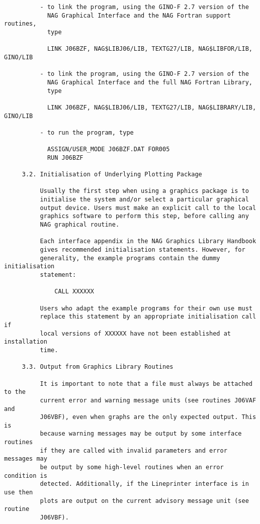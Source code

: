 \begin{verbatim}
          - to link the program, using the GINO-F 2.7 version of the
            NAG Graphical Interface and the NAG Fortran support routines,
            type

            LINK J06BZF, NAG$LIBJ06/LIB, TEXTG27/LIB, NAG$LIBFOR/LIB, GINO/LIB

          - to link the program, using the GINO-F 2.7 version of the
            NAG Graphical Interface and the full NAG Fortran Library,
            type

            LINK J06BZF, NAG$LIBJ06/LIB, TEXTG27/LIB, NAG$LIBRARY/LIB, GINO/LIB

          - to run the program, type

            ASSIGN/USER_MODE J06BZF.DAT FOR005
            RUN J06BZF

     3.2. Initialisation of Underlying Plotting Package

          Usually the first step when using a graphics package is to
          initialise the system and/or select a particular graphical
          output device. Users must make an explicit call to the local
          graphics software to perform this step, before calling any
          NAG graphical routine.

          Each interface appendix in the NAG Graphics Library Handbook
          gives recommended initialisation statements. However, for
          generality, the example programs contain the dummy initialisation
          statement:

              CALL XXXXXX

          Users who adapt the example programs for their own use must
          replace this statement by an appropriate initialisation call if
          local versions of XXXXXX have not been established at installation
          time.

     3.3. Output from Graphics Library Routines

          It is important to note that a file must always be attached to the
          current error and warning message units (see routines J06VAF and
          J06VBF), even when graphs are the only expected output. This is
          because warning messages may be output by some interface routines
          if they are called with invalid parameters and error messages may
          be output by some high-level routines when an error condition is
          detected. Additionally, if the Lineprinter interface is in use then
          plots are output on the current advisory message unit (see routine
          J06VBF).


\end{verbatim}

